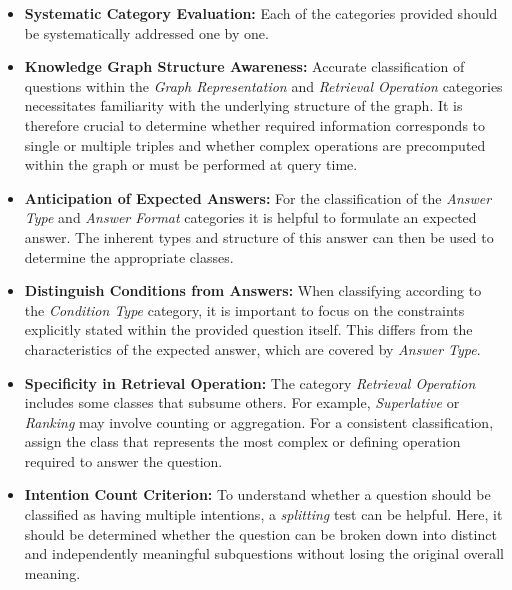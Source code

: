 \begin{itemize}
    \item \textbf{Systematic Category Evaluation:} Each of the categories provided should be systematically addressed one by one. 
    
    \item \textbf{Knowledge Graph Structure Awareness:} Accurate classification of questions within the \emph{Graph Representation} and \emph{Retrieval Operation} categories necessitates familiarity with the underlying structure of the graph. It is therefore crucial to determine whether required information corresponds to single or multiple triples and whether complex operations are precomputed within the graph or must be performed at query time.

    \item \textbf{Anticipation of Expected Answers:} For the classification of the \emph{Answer Type} and \emph{Answer Format} categories it is helpful to formulate an expected answer. The inherent types and structure of this answer can then be used to determine the appropriate classes.

    \item \textbf{Distinguish Conditions from Answers:} When classifying according to the \emph{Condition Type} category, it is important to focus on the constraints explicitly stated within the provided question itself. This differs from the characteristics of the expected answer, which are covered by \emph{Answer Type}.

    \item \textbf{Specificity in Retrieval Operation:} The category \emph{Retrieval Operation} includes some classes that subsume others. For example, \emph{Superlative} or \emph{Ranking} may involve counting or aggregation. For a consistent classification, assign the class that represents the most complex or defining operation required to answer the question.

    \item \textbf{Intention Count Criterion:} To understand whether a question should be classified as having multiple intentions, a \emph{splitting} test can be helpful. Here, it should be determined whether the question can be broken down into distinct and independently meaningful subquestions without losing the original overall meaning.
\end{itemize}

